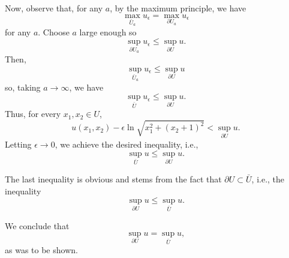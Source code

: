 \begin{solution*}
  Now, observe that, for any \(a\), by the maximum principle, we have
  \[
    \max_{\bar U_a}u_\epsilon=\max_{\partial U_a}u_\epsilon
  \]
  for any \(a\). Choose \(a\) large enough so
  \[
    \sup_{\partial U_a}u_\epsilon\leq
    \sup_{\partial U}u.
  \]
  Then,
  \[
    \sup_{\bar U_a}u_\epsilon\leq\sup_{\partial U}u
  \]
  so, taking \(a\to\infty\), we have
  \[
    \sup_{\bar U}u_\epsilon\leq\sup_{\partial U}u.
  \]
  Thus, for every \(x_1,x_2\in U\),
  \[
    u(x_1,x_2)-\epsilon\ln\sqrt{x_1^2+(x_2+1)^2}<\sup_{\partial U}u.
  \]
  Letting \(\epsilon\to 0\), we achieve the desired inequality, i.e.,
  \[
    \sup_{\bar U}u\leq\sup_{\partial U}u.
  \]

  The last inequality is obvious and stems from the fact that
  \(\partial U\subset\bar U\), i.e., the inequality
  \[
    \sup_{\partial U}u\leq\sup_{\bar U}u.
  \]

  We conclude that
  \[
    \sup_{\partial U}u=\sup_{\bar U}u,
  \]
  as was to be shown.
\end{solution*}

